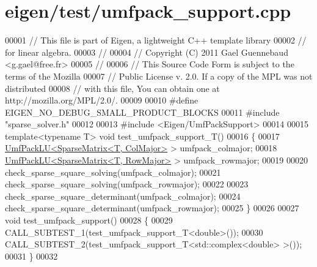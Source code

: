 \hypertarget{eigen_2test_2umfpack__support_8cpp_source}{}\section{eigen/test/umfpack\+\_\+support.cpp}
\label{eigen_2test_2umfpack__support_8cpp_source}

\begin{DoxyCode}
00001 \textcolor{comment}{// This file is part of Eigen, a lightweight C++ template library}
00002 \textcolor{comment}{// for linear algebra.}
00003 \textcolor{comment}{//}
00004 \textcolor{comment}{// Copyright (C) 2011 Gael Guennebaud <g.gael@free.fr>}
00005 \textcolor{comment}{//}
00006 \textcolor{comment}{// This Source Code Form is subject to the terms of the Mozilla}
00007 \textcolor{comment}{// Public License v. 2.0. If a copy of the MPL was not distributed}
00008 \textcolor{comment}{// with this file, You can obtain one at http://mozilla.org/MPL/2.0/.}
00009 
00010 \textcolor{preprocessor}{#define EIGEN\_NO\_DEBUG\_SMALL\_PRODUCT\_BLOCKS}
00011 \textcolor{preprocessor}{#include "sparse\_solver.h"}
00012 
00013 \textcolor{preprocessor}{#include <Eigen/UmfPackSupport>}
00014 
00015 \textcolor{keyword}{template}<\textcolor{keyword}{typename} T> \textcolor{keywordtype}{void} test\_umfpack\_support\_T()
00016 \{
00017   \hyperlink{class_eigen_1_1_umf_pack_l_u}{UmfPackLU<SparseMatrix<T, ColMajor>} > umfpack\_colmajor;
00018   \hyperlink{class_eigen_1_1_umf_pack_l_u}{UmfPackLU<SparseMatrix<T, RowMajor>} > umfpack\_rowmajor;
00019   
00020   check\_sparse\_square\_solving(umfpack\_colmajor);
00021   check\_sparse\_square\_solving(umfpack\_rowmajor);
00022   
00023   check\_sparse\_square\_determinant(umfpack\_colmajor);
00024   check\_sparse\_square\_determinant(umfpack\_rowmajor);
00025 \}
00026 
00027 \textcolor{keywordtype}{void} test\_umfpack\_support()
00028 \{
00029   CALL\_SUBTEST\_1(test\_umfpack\_support\_T<double>());
00030   CALL\_SUBTEST\_2(test\_umfpack\_support\_T<std::complex<double> >());
00031 \}
00032 
\end{DoxyCode}
